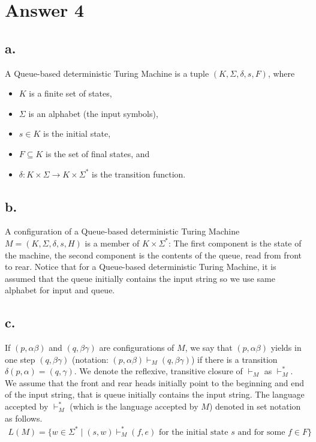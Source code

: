 \documentclass[12pt]{article}
\begin{document}
\section*{Answer 4}

\subsection*{a.}
A Queue-based deterministic Turing Machine is a tuple $(K, \Sigma, \delta, s, F)$, where
\begin{itemize}
	\item $K$ is a finite set of states,
	\item $\Sigma$ is an alphabet (the input symbols),
	\item $s \in K$ is the initial state,
	\item $F \subseteq K$ is the set of final states, and
	\item $\delta: K \times \Sigma \to K \times \Sigma^*$ is the transition function.
\end{itemize}

\subsection*{b.}
A configuration of a Queue-based deterministic Turing Machine $M = (K, \Sigma, \delta, s, H)$ is a member of $K \times \Sigma^*$: The first component is the state of the machine, the second component is the contents of the queue, read from front to rear. Notice that for a Queue-based deterministic Turing Machine, it is assumed that the queue initially contains the input string so we use same alphabet for input and queue.

\subsection*{c.}
If $(p, \alpha\beta)$ and $(q, \beta\gamma)$ are configurations of $M$, we say that $(p, \alpha\beta)$ yields in one step $(q, \beta\gamma)$ \big(notation: $(p, \alpha\beta) \vdash_M (q, \beta\gamma)$\big) if there is a transition $\delta(p, \alpha) = (q, \gamma)$. We denote the reflexive, transitive closure of $\vdash_M$ as $\vdash_M^*$. We assume that the front and rear heads initially point to the beginning and end of the input string, that is queue initially contains the input string. The language accepted by $\vdash_M^*$ (which is the language accepted by $M$) denoted in set notation as follows.
\begin{align}
	L(M) = \{w \in \Sigma^* \mid (s, w) \vdash_M^* (f, e) \text{ for the initial state } s \text{ and for some } f \in F\}
\end{align}
\end{document}
